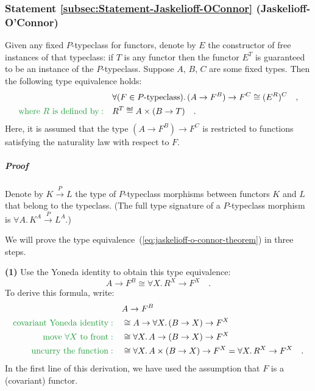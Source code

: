 \subsubsection{Statement \label{subsec:Statement-Jaskelioff-OConnor}\ref{subsec:Statement-Jaskelioff-OConnor}
(Jaskelioff-O\textsf{'}Connor)}

Given any fixed $P$-typeclass for functors, denote by $E$ the constructor
of free instances of that typeclass: if $T$ is any functor then the
functor $E^{T}$ is guaranteed to be an instance of the $P$-typeclass.
Suppose $A$, $B$, $C$ are some fixed types. Then the following
type equivalence holds:
\begin{align}
 & \forall(F\in P\text{-typeclass}).\,(A\rightarrow F^{B})\rightarrow F^{C}\cong(E^{R})^{C}\quad,\label{eq:jaskelioff-o-connor-theorem}\\
{\color{greenunder}\text{where }R\text{ is defined by}:}\quad & R^{T}\triangleq A\times(B\rightarrow T)\quad.\nonumber 
\end{align}
Here, it is assumed that the type $(A\rightarrow F^{B})\rightarrow F^{C}$
is restricted to functions satisfying the naturality law with respect
to $F$.

\subparagraph{Proof}

Denote by $K\overset{P}{\rightarrow}L$ the type of $P$-typeclass
morphisms between functors $K$ and $L$ that belong to the typeclass.
(The full type signature of a $P$-typeclass morphism is $\forall A.\,K^{A}\overset{P}{\rightarrow}L^{A}$.)

We will prove the type equivalence~(\ref{eq:jaskelioff-o-connor-theorem})
in three steps.

\textbf{(1)} Use the Yoneda identity to obtain this type equivalence:
\[
A\rightarrow F^{B}\cong\forall X.\,R^{X}\rightarrow F^{X}\quad.
\]
To derive this formula, write:
\begin{align*}
 & A\rightarrow F^{B}\\
{\color{greenunder}\text{covariant Yoneda identity}:}\quad & \cong A\rightarrow\forall X.\,(B\rightarrow X)\rightarrow F^{X}\\
{\color{greenunder}\text{move }\forall X\text{ to front}:}\quad & \cong\forall X.\,A\rightarrow(B\rightarrow X)\rightarrow F^{X}\\
{\color{greenunder}\text{uncurry the function}:}\quad & \cong\forall X.\,A\times(B\rightarrow X)\rightarrow F^{X}=\forall X.\,R^{X}\rightarrow F^{X}\quad.
\end{align*}
In the first line of this derivation, we have used the assumption
that $F$ is a (covariant) functor.

